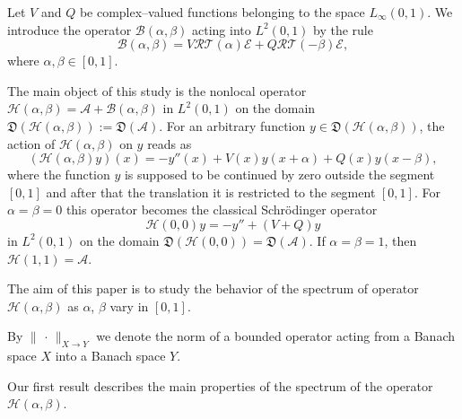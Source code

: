 \documentclass[10pt, a4paper]{article}
\theoremstyle{plain}
\theoremstyle{definition}
\numberwithin{equation}{section}
\def\cE{\mathcal{E}}
\begin{document}
Let $V$ and $Q$ be complex--valued functions belonging to the space $L_\infty (0, 1)$.
We introduce the operator $\mathcal{B}(\alpha, \beta)$ acting into $L^2(0, 1)$ by the rule
\begin{equation}\label{B}
\mathcal{B}(\alpha, \beta) =V\mathcal{R}\mathcal{T}(\alpha)\cE
+Q\mathcal{R}\mathcal{T}(-\beta)\cE,
\end{equation}
where $\alpha, \beta\in [0, 1]$.

The main object of this study is the nonlocal operator $\mathcal{H}(\alpha, \beta)
=\mathcal{A}+\mathcal{B}(\alpha, \beta)$
in $L^2(0, 1)$ on the domain $\mathfrak{D}(\mathcal{H}(\alpha, \beta)):=\mathfrak{D}(\mathcal{A})$.
For an arbitrary function $y\in\mathfrak{D}(\mathcal{H}(\alpha, \beta))$, the action of
$\mathcal{H}(\alpha, \beta)$ on $y$ reads as
\[
(\mathcal{H}(\alpha, \beta)y)(x)=-y''(x)+V(x)y(x+\alpha)+Q(x)y(x-\beta),
\]
where the function $y$ is supposed to be continued by zero outside the segment $[0, 1]$
and after that the translation it is restricted to the segment $[0, 1]$. For $\alpha=\beta=0$  this operator becomes the classical Schr\"odinger operator
\[
\mathcal{H}(0, 0)y=-y''+(V+Q)y
\]
in $L^2(0, 1)$ on the domain $\mathfrak{D}(\mathcal{H}(0, 0))=\mathfrak{D}(\mathcal{A})$. If $\alpha=\beta=1$, then $\mathcal{H}(1, 1)=\mathcal{A}$.

The aim of this paper is to study the behavior of the spectrum of   operator
$\mathcal{H}(\alpha, \beta)$ as $\alpha$, $\beta$ vary in $[0, 1]$.

 By $\|\,\cdot\,\|_{X\to Y}$ we denote the norm of a bounded operator acting from a Banach space $X$ into a Banach space $Y.$

Our first result describes the main properties of the spectrum
of the operator $\mathcal{H}(\alpha, \beta)$.
\end{document}

